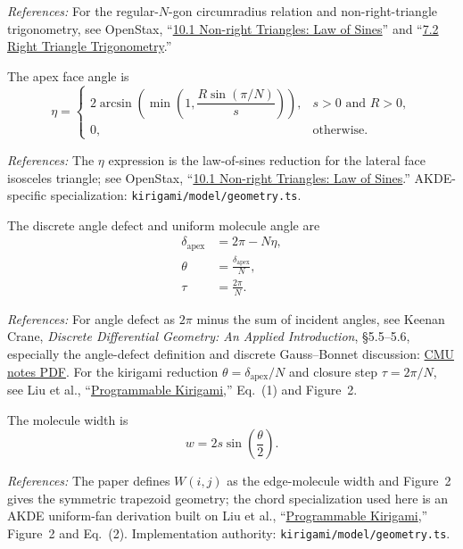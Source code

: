 \documentclass[11pt]{article}
\newcommand{\formularefs}[1]{%
\par\smallskip
\noindent\footnotesize\textit{References: }#1
\par\smallskip\normalsize
}
\begin{document}
\formularefs{For the regular-\(N\)-gon circumradius relation and non-right-triangle trigonometry, see OpenStax, ``\href{https://openstax.org/books/algebra-and-trigonometry-2e/pages/10-1-non-right-triangles-law-of-sines}{10.1 Non-right Triangles: Law of Sines}'' and ``\href{https://openstax.org/books/algebra-and-trigonometry-2e/pages/7-2-right-triangle-trigonometry}{7.2 Right Triangle Trigonometry}.''}

The apex face angle is
\begin{equation}
\eta =
\begin{cases}
2\arcsin\!\left(\min\!\left(1,\dfrac{R\sin(\pi/N)}{s}\right)\right), & s>0 \text{ and } R>0,\\[6pt]
0, & \text{otherwise.}
\end{cases}
\end{equation}

\formularefs{The \(\eta\) expression is the law-of-sines reduction for the lateral face isosceles triangle; see OpenStax, ``\href{https://openstax.org/books/algebra-and-trigonometry-2e/pages/10-1-non-right-triangles-law-of-sines}{10.1 Non-right Triangles: Law of Sines}.'' AKDE-specific specialization: \texttt{kirigami/model/geometry.ts}.}

The discrete angle defect and uniform molecule angle are
\begin{align}
\delta_{\mathrm{apex}} &= 2\pi - N\eta, \\
\theta &= \frac{\delta_{\mathrm{apex}}}{N}, \\
\tau &= \frac{2\pi}{N}.
\end{align}

\formularefs{For angle defect as \(2\pi\) minus the sum of incident angles, see Keenan Crane, \emph{Discrete Differential Geometry: An Applied Introduction}, §5.5--5.6, especially the angle-defect definition and discrete Gauss--Bonnet discussion: \href{https://www.cs.cmu.edu/~kmcrane/Projects/DDG/paper.pdf}{CMU notes PDF}. For the kirigami reduction \(\theta=\delta_{\mathrm{apex}}/N\) and closure step \(\tau=2\pi/N\), see Liu et al., ``\href{https://static1.squarespace.com/static/5783b6f903596e5098f3fce8/t/5dd2e95aee053940522eab1a/1574103423054/DETC2019-97557.pdf}{Programmable Kirigami},'' Eq.~(1) and Figure~2.}

The molecule width is
\begin{equation}
w = 2s\sin\!\left(\frac{\theta}{2}\right).
\end{equation}

\formularefs{The paper defines \(W(i,j)\) as the edge-molecule width and Figure~2 gives the symmetric trapezoid geometry; the chord specialization used here is an AKDE uniform-fan derivation built on Liu et al., ``\href{https://static1.squarespace.com/static/5783b6f903596e5098f3fce8/t/5dd2e95aee053940522eab1a/1574103423054/DETC2019-97557.pdf}{Programmable Kirigami},'' Figure~2 and Eq.~(2). Implementation authority: \texttt{kirigami/model/geometry.ts}.}
\end{document}
